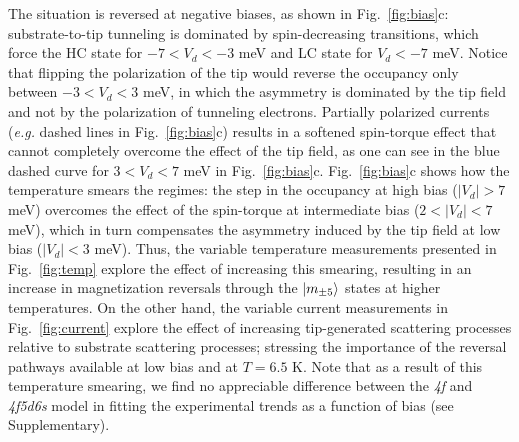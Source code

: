 \documentclass[
reprint,amsmath,amssymb,aps]{revtex4-2}
\begin{document}
The situation is reversed at negative biases, as shown in Fig.~\ref{fig:bias}c: substrate-to-tip tunneling is dominated by spin-decreasing transitions, which force the HC state for $-7<V_d<-3$ meV and LC state for $V_d<-7$ meV. Notice that flipping the polarization of the tip would reverse the occupancy only between $-3<V_d<3$ meV, in which the asymmetry is dominated by the tip field and not by the polarization of tunneling electrons. Partially polarized currents (\textit{e.g.} dashed lines in Fig.~\ref{fig:bias}c) results in a softened spin-torque effect that cannot completely overcome the effect of the tip field, as one can see in the blue dashed curve for $3<V_d<7$ meV in Fig.~\ref{fig:bias}c.  Fig.~\ref{fig:bias}c shows how the temperature smears the regimes: the step in the occupancy at high bias ($|V_d|>7$ meV) overcomes the effect of the spin-torque at intermediate bias ($2<|V_d|<7$ meV), which in turn compensates the asymmetry induced by the tip field at low bias ($|V_d|<3$ meV). Thus, the variable temperature measurements presented in Fig.~\ref{fig:temp} explore the effect of increasing this smearing, resulting in an increase in magnetization reversals through the $\ket{m_{\pm 5}}$ states at higher temperatures. On the other hand, the variable current measurements in Fig.~\ref{fig:current} explore the effect of increasing tip-generated scattering processes relative to substrate scattering processes; stressing the importance of the reversal pathways available at low bias and at $T=6.5$ K. Note that as a result of this temperature smearing, we find no appreciable difference between the \textit{4f} and \textit{4f5d6s} model in fitting the experimental trends as a function of bias (see Supplementary).





\end{document}
